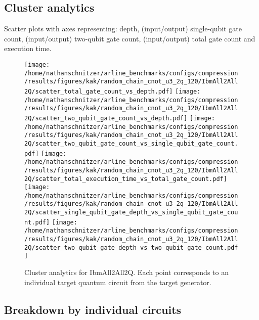 \documentclass{report}%
\begin{document}
\subsection*{Cluster analytics }%
\label{subsec:Clusteranalytics}%

%
Scatter plots with axes representing: depth, (input/output) single-qubit gate count,
                (input/output) two-qubit gate count, (input/output) total gate count and execution time.%


\begin{figure}[h!]%
\centering%
\texttt{[image: /home/nathanschnitzer/arline\_benchmarks/configs/compression/results/figures/kak/random\_chain\_cnot\_u3\_2q\_120/IbmAll2All2Q/scatter\_total\_gate\_count\_vs\_depth.pdf]}%
\centering%
\texttt{[image: /home/nathanschnitzer/arline\_benchmarks/configs/compression/results/figures/kak/random\_chain\_cnot\_u3\_2q\_120/IbmAll2All2Q/scatter\_two\_qubit\_gate\_count\_vs\_depth.pdf]}%
\linebreak%
\centering%
\texttt{[image: /home/nathanschnitzer/arline\_benchmarks/configs/compression/results/figures/kak/random\_chain\_cnot\_u3\_2q\_120/IbmAll2All2Q/scatter\_two\_qubit\_gate\_count\_vs\_single\_qubit\_gate\_count.pdf]}%
\centering%
\texttt{[image: /home/nathanschnitzer/arline\_benchmarks/configs/compression/results/figures/kak/random\_chain\_cnot\_u3\_2q\_120/IbmAll2All2Q/scatter\_total\_execution\_time\_vs\_total\_gate\_count.pdf]}%
\linebreak%
\centering%
\texttt{[image: /home/nathanschnitzer/arline\_benchmarks/configs/compression/results/figures/kak/random\_chain\_cnot\_u3\_2q\_120/IbmAll2All2Q/scatter\_single\_qubit\_gate\_depth\_vs\_single\_qubit\_gate\_count.pdf]}%
\centering%
\texttt{[image: /home/nathanschnitzer/arline\_benchmarks/configs/compression/results/figures/kak/random\_chain\_cnot\_u3\_2q\_120/IbmAll2All2Q/scatter\_two\_qubit\_gate\_depth\_vs\_two\_qubit\_gate\_count.pdf]}%
\linebreak%
\caption{Cluster analytics for IbmAll2All2Q. Each point corresponds to an individual target
                    quantum circuit from the target generator.}%
\end{figure}

%
\clearpage%
\subsection*{Breakdown by individual circuits }%
\label{subsec:Breakdownbyindividualcircuits}%
\end{document}
